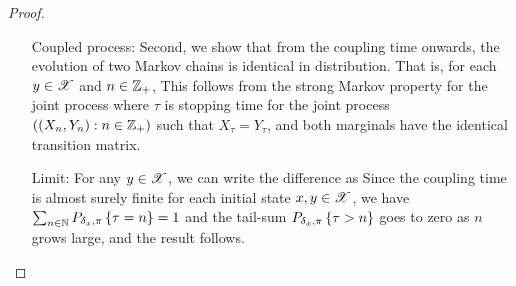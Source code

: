 \documentclass[letterpaper,10pt,english]{article}
\begin{document}
{\begin{proof}
\begin{itemize}
\begin{itemize}
\end{itemize}
In particular, the coupling time is almost surely finite.  
\item[Coupled process:] Second, we show that from the coupling time onwards, the evolution of two Markov chains is identical in distribution.  
That is, for each $y \in \mathscr{X}$ and $n \in \mathbb{Z}_+$, 
This follows from the strong Markov property for the joint process where $\tau$ is stopping time for the joint process $((X_n, Y_n): n \in \mathbb{Z}_+)$ such that $X_\tau = Y_\tau$, 
and both marginals  have the identical transition matrix. %
\item[Limit:] For any $y \in \mathscr{X}$, we can write the difference as 
Since the coupling time is almost surely finite for each initial state $x,y \in \mathscr{X}$, 
we have $\sum_{n \in \mathbb{N}}P_{\delta_x,\pi}\left\{\tau = n\right\} = 1$ and the tail-sum $P_{\delta_x,\pi}\left\{\tau > n\right\}$ goes to zero as $n$ grows large, and the result follows. 
\end{itemize}
\end{proof}
}
\end{document}
